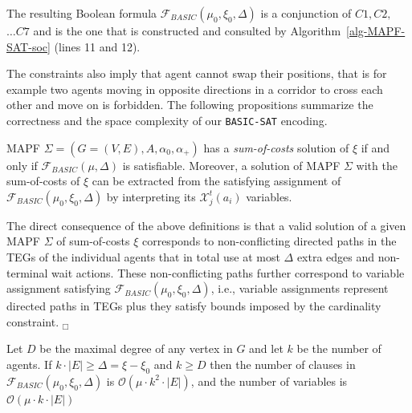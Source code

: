 \documentclass[jair,oneside,11pt]{article}
\begin{document}


  The resulting Boolean formula $\mathcal{F}_{BASIC}(\mu_0, \xi_0, \Delta)$ is a
conjunction of $C1, C2,$ $\ldots C7$ and is the one that is constructed and consulted by Algorithm~\ref{alg-MAPF-SAT-soc} (lines 11 and 12).
\vspace{0.25cm}

The constraints also imply that agent cannot swap their positions, that is for example two agents moving in opposite directions in a corridor to cross each other and move on is forbidden. The following propositions summarize the correctness and the space complexity of our \texttt{BASIC-SAT} encoding.

\begin{proposition}
MAPF $\Sigma=({G=(V,E)},A,\alpha_0,\alpha_+)$ has a \textit{sum-of-costs} solution of $\xi$ if and only if $\mathcal{F}_{BASIC}(\mu, \Delta)$ is satisfiable. Moreover, a solution of MAPF $\Sigma$ with the sum-of-costs of $\xi$ can be extracted from the satisfying assignment of $\mathcal{F}_{BASIC}(\mu_0, \xi_0, \Delta)$ by interpreting its $\mathcal{X}^t_j(a_i)$ variables.
\end{proposition}


 The direct consequence of the above definitions is that a valid solution of a given MAPF $\Sigma$ of sum-of-costs $\xi$ corresponds to non-conflicting directed paths in the TEGs of the individual agents that in total use at most $\Delta$ extra edges and non-terminal wait actions. These non-conflicting paths further correspond to variable assignment satisfying $\mathcal{F}_{BASIC}(\mu_0, \xi_0, \Delta)$, i.e., variable assignments represent directed paths in TEGs plus they satisfy bounds imposed by the cardinality constraint. $_\Box$

\begin{proposition}
Let $D$ be the maximal degree of any vertex in $G$ and let $k$ be the number of agents. If $k \cdot|E|\geq \Delta = \xi-\xi_0$ and $k \geq D$ then the number of clauses in $\mathcal{F}_{BASIC}(\mu_0,\xi_0, \Delta)$ is $\mathcal{O}(\mu \cdot k^2\cdot |E|)$, and the number of variables is $\mathcal{O}(\mu \cdot k \cdot |E|)$
 \end{proposition}
 
\end{document}

